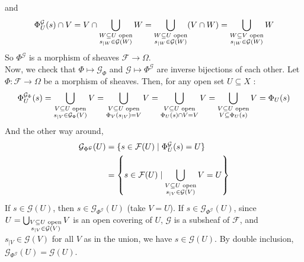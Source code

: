 \documentclass{article}
\newcommand{\F}{\mathcal{F}}
\newcommand{\G}{\mathcal{G}}
\begin{document}
\begin{enumerate}
    and
    \[
    \Phi^\G_U (s) \cap V =  V \cap \bigcup_{\begin{subarray}{c} W \subseteq U \text{ open} \\ s_{\mid W} \in \G(W) \end{subarray}} W = \bigcup_{\begin{subarray}{c} W \subseteq U \text{ open} \\ s_{\mid W} \in \G(W) \end{subarray}} (V \cap W) = \bigcup_{\begin{subarray}{c} W \subseteq V \text{ open} \\ s_{\mid W} \in \G(W) \end{subarray}} W
    \]
    So $\Phi^\G$ is a morphism of sheaves $\F \to \Omega$. \\
    Now, we check that $\Phi \mapsto \G_\Phi$ and $\G \mapsto \Phi^\G$ are inverse bijections of each other. Let $\Phi : \F \to \Omega$ be a morphism of sheaves. Then, for any open set $U \subseteq X$ :
    \[
    \Phi^{\G_\Phi}_U (s) = \bigcup_{\begin{subarray}{c} V \subseteq U \text{ open} \\ s_{\mid V} \in \G_\Phi(V) \end{subarray}} V = \bigcup_{\begin{subarray}{c} V \subseteq U \text{ open} \\ \Phi_V (s_{\mid V}) = V \end{subarray}} V = \bigcup_{\begin{subarray}{c} V \subseteq U \text{ open} \\ \Phi_U (s) \cap V = V \end{subarray}} V = \bigcup_{\begin{subarray}{c} V \subseteq U \text{ open} \\ V \subseteq \Phi_U (s) \end{subarray}} V = \Phi_U (s)
    \]
    And the other way around,
    \begin{align*}
        \G_{\Phi^\G} (U)
        & = \{s \in \F(U) \mid \Phi^\G_U (s) = U\} \\
        & = \left\{s \in \F(U) \mid \bigcup_{\begin{subarray}{c} V \subseteq U \text{ open} \\ s_{\mid V} \in \G(V) \end{subarray}} V = U\right\} \\
    \end{align*}
    If $s \in \G(U)$, then $s \in \G_{\Phi^\G}(U)$ (take $V=U$). If $s \in \G_{\Phi^\G} (U)$, since $U = \bigcup_{\begin{subarray}{c} V \subseteq U \text{ open} \\ s_{\mid V} \in \G(V) \end{subarray}} V$ is an open covering of $U$, $\G$ is a subsheaf of $\F$, and $s_{\mid V} \in \G(V)$ for all $V$ as in the union, we have $s \in \G(U)$. By double inclusion, $\G_{\Phi^\G}(U) = \G(U)$. \\

\end{enumerate}
\end{document}
